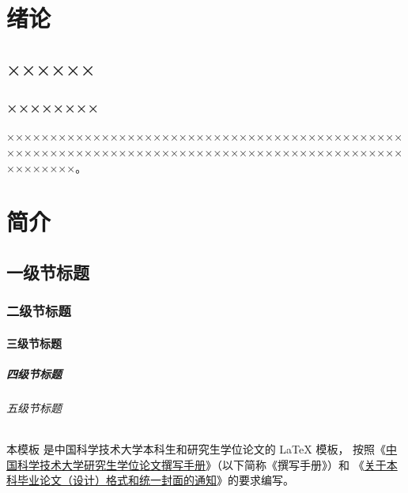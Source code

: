 
\chapter{绪论}

\section{××××××}

\subsection{××××××××}

×\-×\-×\-×\-×\-×\-×\-×\-×\-×\-×\-×\-×\-×\-×\-×\-×\-×\-×\-×\-×\-×\-×\-×\-×\-×\-×\-×\-×\-×\-×\-×\-×\-×\-×\-×\-×\-×\-×\-×\-×\-×\-×\-×\-×\-×\-×\-×\-×\-×\-×\-×\-×\-×\-×\-×\-×\-×\-×\-×\-×\-×\-×\-×\-×\-×\-×\-×\-×\-×\-×\-×\-×\-×\-×\-×\-×\-×\-×\-×\-×\-×\-×\-×\-×\-×\-×\-×\-×\-×\-×\-×\-×\-×\-×\-×\-×\-×\-×\-×。


\chapter{简介}

\section{一级节标题}

\subsection{二级节标题}

\subsubsection{三级节标题}

\paragraph{四级节标题}

\subparagraph{五级节标题}

本模板  是中国科学技术大学本科生和研究生学位论文的 \LaTeX{}
模板， 按照《\href{http://gradschool.ustc.edu.cn/static/oldsite/ylb/material/xw/wdxz/32.pdf}
{中国科学技术大学研究生学位论文撰写手册}》（以下简称《撰写手册》）和
《\href{https://www.teach.ustc.edu.cn/notice/notice-teaching/11530.html}
{关于本科毕业论文（设计）格式和统一封面的通知}》的要求编写。


